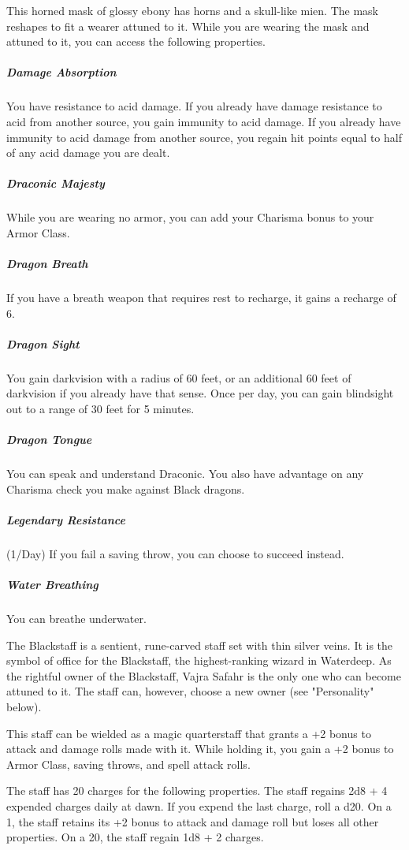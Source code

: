 \documentclass[10pt,a4paper,twoside,bg=print,twocolumn,openany,nodeprecatedcode]{dndbook}
\begin{document}
This horned mask of glossy ebony has horns and a skull-like mien. The mask reshapes to fit a wearer attuned to it. While you are wearing the mask and attuned to it, you can access the following properties.

\subparagraph{Damage Absorption}
You have resistance to acid damage. If you already have damage resistance to acid from another source, you gain immunity to acid damage. If you already have immunity to acid damage from another source, you regain hit points equal to half of any acid damage you are dealt.

\subparagraph{Draconic Majesty}
While you are wearing no armor, you can add your Charisma bonus to your Armor Class.

\subparagraph{Dragon Breath}
If you have a breath weapon that requires rest to recharge, it gains a recharge of 6.

\subparagraph{Dragon Sight}
You gain darkvision with a radius of 60 feet, or an additional 60 feet of darkvision if you already have that sense. Once per day, you can gain blindsight out to a range of 30 feet for 5 minutes.

\subparagraph{Dragon Tongue}
You can speak and understand Draconic. You also have advantage on any Charisma check you make against Black dragons.

\subparagraph{Legendary Resistance}
(1/Day) If you fail a saving throw, you can choose to succeed instead.

\subparagraph{Water Breathing}
You can breathe underwater.

The Blackstaff is a sentient, rune-carved staff set with thin silver veins. It is the symbol of office for the Blackstaff, the highest-ranking wizard in Waterdeep. As the rightful owner of the Blackstaff, Vajra Safahr is the only one who can become attuned to it. The staff can, however, choose a new owner (see "Personality" below).

This staff can be wielded as a magic quarterstaff that grants a +2 bonus to attack and damage rolls made with it. While holding it, you gain a +2 bonus to Armor Class, saving throws, and spell attack rolls.

The staff has 20 charges for the following properties. The staff regains 2d8 + 4 expended charges daily at dawn. If you expend the last charge, roll a d20. On a 1, the staff retains its +2 bonus to attack and damage roll but loses all other properties. On a 20, the staff regain 1d8 + 2 charges.
\end{document}
